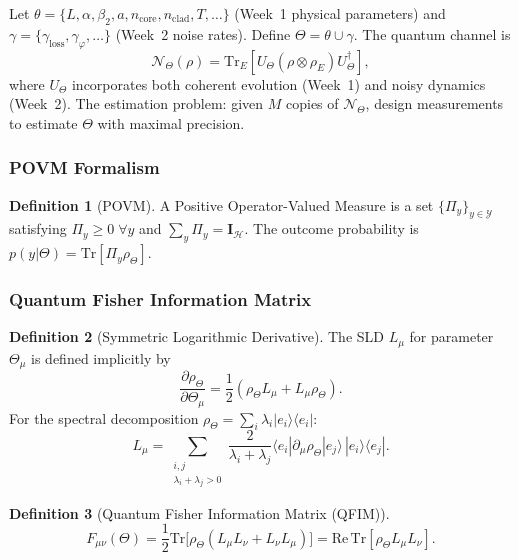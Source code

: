 \documentclass[journal,twocolumn]{IEEEtran}
\theoremstyle{definition}
\newtheorem{definition}{Definition}[section]
\theoremstyle{plain}
\newcommand{\tensor}{\otimes}
\newcommand{\Tr}{\mathrm{Tr}}
\begin{document}
Let
$\theta=\{L,\alpha,\beta_2,a,n_{\mathrm{core}},n_{\mathrm{clad}},T,\dots\}$
(Week~1 physical parameters) and
$\gamma=\{\gamma_{\mathrm{loss}},\gamma_\varphi,\dots\}$ (Week~2 noise
rates). Define $\Theta=\theta\cup\gamma$. The quantum channel is
\begin{equation}
  \mathcal{N}_\Theta(\rho)=\Tr_E\!\left[U_\Theta(\rho\tensor\rho_E)
  U_\Theta^\dagger\right],
\end{equation}
where $U_\Theta$ incorporates both coherent evolution (Week~1) and
noisy dynamics (Week~2). The estimation problem: given $M$ copies of
$\mathcal{N}_\Theta$, design measurements to estimate $\Theta$ with
maximal precision.

\subsubsection{POVM Formalism}

\begin{definition}[POVM]
A Positive Operator-Valued Measure is a set $\{\Pi_y\}_{y\in\mathcal{Y}}$
satisfying $\Pi_y\ge0\;\forall y$ and $\sum_y\Pi_y=\mathbf{I}_\mathcal{H}$.
The outcome probability is $p(y|\Theta)=\Tr[\Pi_y\rho_\Theta]$.
\end{definition}

\subsubsection{Quantum Fisher Information Matrix}

\begin{definition}[Symmetric Logarithmic Derivative]
The SLD $L_\mu$ for parameter $\Theta_\mu$ is defined implicitly by
\begin{equation}
  \frac{\partial\rho_\Theta}{\partial\Theta_\mu}=
  \frac{1}{2}(\rho_\Theta L_\mu+L_\mu\rho_\Theta).
\end{equation}
For the spectral decomposition
$\rho_\Theta=\sum_i\lambda_i|e_i\rangle\langle e_i|$:
\begin{equation}
  L_\mu=\sum_{\substack{i,j\\\lambda_i+\lambda_j>0}}
  \frac{2}{\lambda_i+\lambda_j}
  \langle e_i|\partial_\mu\rho_\Theta|e_j\rangle\,
  |e_i\rangle\langle e_j|.
  \label{eq:SLD}
\end{equation}
\end{definition}

\begin{definition}[Quantum Fisher Information Matrix (QFIM)]
\begin{equation}
  F_{\mu\nu}(\Theta)=\frac{1}{2}\Tr\bigl[\rho_\Theta
  (L_\mu L_\nu+L_\nu L_\mu)\bigr]
  =\mathrm{Re}\,\Tr[\rho_\Theta L_\mu L_\nu].
  \label{eq:QFIM}
\end{equation}
\end{definition}
\end{document}

